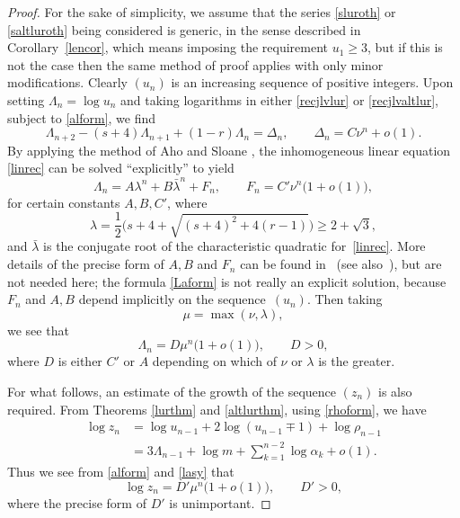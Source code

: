 \documentclass[12pt,a4paper]{amsart}
\theoremstyle{definition}
\numberwithin{equation}{section}
\newcommand\la{{\lambda}}
\newcommand\La{{\Lambda}}
\newcommand\al{{\alpha}}
\begin{document}
\begin{proof}
For the sake of simplicity, we assume that the series \eqref{sluroth} or 
\eqref{saltluroth} being considered is generic, in the sense described in Corollary~\ref{lencor}, 
which means imposing the requirement $u_1\geq 3$, but if this is not the case 
then the same method of proof applies 
with only minor modifications. Clearly $(u_n)$ is an increasing sequence of 
positive integers. 
Upon setting $\La_n=\log u_n$ and taking logarithms in either  
\eqref{recjlvlur} or \eqref{recjlvaltlur}, subject to \eqref{alform}, we find  
\begin{equation} 
\label{linrec}
\La_{n+2}-(s+4)\La_{n+1}+(1-r)\La_n=\Delta_n, \qquad \Delta_n=C\nu^n +o(1). 
\end{equation} 
By applying the method of Aho and Sloane \cite{ahosloane}, 
the inhomogeneous linear equation \eqref{linrec} can be solved ``explicitly'' to yield 
\begin{equation}
\label{Laform} 
\La_n = A\la^n +B\bar{\la}^n + F_n, \qquad F_n = C'\nu^n\big(1 +o(1)\big), 
\end{equation} 
for certain constants $A,B,C'$, where 
\begin{equation}
\label{laval1} 
\la = \frac{1}{2}\Big(s+4+\sqrt{(s+4)^2+4(r-1)}\Big)\geq 2+\sqrt{3}, 
\end{equation} 
and $\bar{\la}$ is the conjugate root of the characteristic quadratic for~\eqref{linrec}. 
More details of the precise form of $A,B$ and $F_n$ can be found in~\cite{Hone1} (see also~\cite{HoneVar}), 
but are not needed here; the formula \eqref{Laform} is not really 
an explicit solution, because $F_n$ and $A,B$ depend implicitly on the sequence~$(u_n)$. Then taking
\[ 
\mu = \max (\nu,\la), 
\] 
we see that 
\begin{equation}
\label{lasy} 
\Lambda_n =D\mu^n\big(1+o(1)\big), \qquad D>0, 
\end{equation} 
where $D$ is either $C'$ or $A$ depending on which of $\nu$ or $\la$ is the greater. 

For what follows, an estimate of the growth of the sequence $(z_n)$ is also required. 
From Theorems \ref{lurthm} and \ref{altlurthm}, 
using \eqref{rhoform}, we have 
\begin{align*} 
\log z_n & = \log u_{n-1}+2\log(u_{n-1}\mp 1)+\log\rho_{n-1}\\ 
& = 3\La_{n-1}+\log m+\sum_{k=1}^{n-2}\log\al_k+o(1). 
\end{align*} 
Thus we see from \eqref{alform} and \eqref{lasy} that 
\begin{equation}
\label{zasy} 
\log z_n = D'\mu^n\big(1+o(1)\big), \qquad D'>0,
\end{equation} 
where the precise form of $D'$ is unimportant. 


\end{proof}
\end{document}
